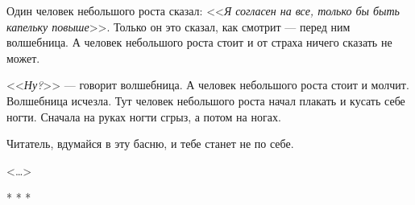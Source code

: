 
Один человек небольшого роста сказал: <<\textit{Я согласен на все, только бы быть капельку повыше}>>. Только он это сказал, как смотрит --- перед ним волшебница. А человек небольшого роста стоит и от страха ничего сказать не может.

<<\textit{Ну?}>> --- говорит волшебница. А человек небольшого роста стоит и молчит. Волшебница исчезла. Тут человек небольшого роста начал плакать и кусать себе ногти. Сначала на руках ногти сгрыз, а потом на ногах. 

Читатель, вдумайся в эту басню, и тебе станет не по себе.

\begin{flushright} <\dots> \end{flushright} 
\begin{center} * * * \end{center} 